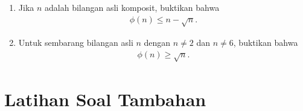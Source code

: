 \documentclass[12pt]{scrartcl}
\begin{document}
\begin{enumerate}[resume]
    \item Jika $n$ adalah bilangan asli komposit, buktikan bahwa
    \begin{align*}
        \phi(n) \le n - \sqrt{n}.
    \end{align*}

    \item Untuk sembarang bilangan asli $n$ dengan $n \neq 2$ dan $n \neq 6$, buktikan bahwa
    \begin{align*}
        \phi(n) \ge \sqrt{n}.
    \end{align*}
\end{enumerate}

\section{Latihan Soal Tambahan}
\end{document}
